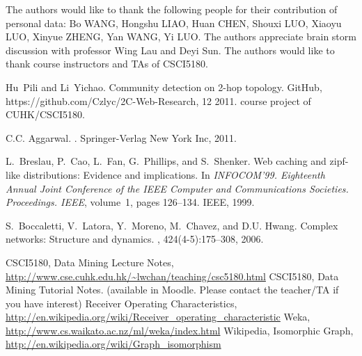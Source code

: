 \documentclass[11pt,a4paper]{article}
\begin{document}
The authors would like to thank the following people for their contribution of 
personal data: 
Bo WANG, Hongshu LIAO, Huan CHEN, Shouxi LUO, 
Xiaoyu LUO, Xinyue ZHENG, Yan WANG, Yi LUO. 
The authors appreciate brain storm discussion with professor Wing Lau 
and Deyi Sun. 
The authors would like to thank course instructors and TAs of CSCI5180. 



%
%
%


\begin{thebibliography}{99}

Hu~Pili and Li~Yichao.
\newblock Community detection on 2-hop topology.
\newblock GitHub, https://github.com/Czlyc/2C-Web-Research, 12 2011.
\newblock course project of CUHK/CSCI5180.

C.C. Aggarwal.
.
\newblock Springer-Verlag New York Inc, 2011.

L.~Breslau, P.~Cao, L.~Fan, G.~Phillips, and S.~Shenker.
\newblock Web caching and zipf-like distributions: Evidence and implications.
\newblock In {\em INFOCOM'99. Eighteenth Annual Joint Conference of the IEEE
  Computer and Communications Societies. Proceedings. IEEE}, volume~1, pages
  126--134. IEEE, 1999.

S.~Boccaletti, V.~Latora, Y.~Moreno, M.~Chavez, and D.U. Hwang.
\newblock Complex networks: Structure and dynamics.
, 424(4-5):175--308, 2006.


	 CSCI5180, Data Mining Lecture Notes, 
		\url{http://www.cse.cuhk.edu.hk/~lwchan/teaching/csc5180.html}
	 CSCI5180, Data Mining Tutorial Notes. 
		(available in Moodle. Please contact the teacher/TA if you have 
		interest)
	 Receiver Operating Characteristics, 
		\url{http://en.wikipedia.org/wiki/Receiver_operating_characteristic}
	 Weka, 
		\url{http://www.cs.waikato.ac.nz/ml/weka/index.html}
	 Wikipedia, Isomorphic Graph, 
		\url{http://en.wikipedia.org/wiki/Graph_isomorphism}
\end{thebibliography}
\end{document}
